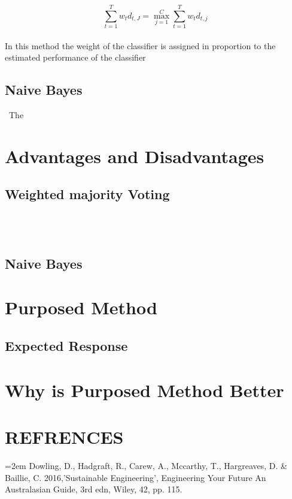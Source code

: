 \documentclass{article}
\begin{document}
$$\displaystyle\sum_{t=1}^{T}w_{t}d_{t,J}=\displaystyle\mathop{\max}_{j=1}^{C}\displaystyle\sum_{t=1}^{T}w_{t}d_{t,j}$$
\\
In this method the weight of the classifier is assigned in proportion to the estimated performance of the classifier
\subsection{Naive Bayes}\
The 


\section{Advantages and Disadvantages}
\subsection{Weighted majority Voting}\label{SEC:Enviro}
\\
\\

\subsection{Naive Bayes}\label{sec:Social}


\section{Purposed Method}
\subsection{Expected Response}\label{sec:EXPECTED}


        
\section{Why is Purposed Method Better}\label{conclusion}
\pagebreak
\section{REFRENCES}\label{refrences}
\begin{flushleft}

\hangindent=2em
Dowling, D., Hadgraft, R., Carew, A., Mccarthy, T., Hargreaves, D. \& Baillie, C. 2016,'Sustainable Engineering', Engineering Your Future An Australasian Guide, 3rd edn, Wiley, 42, pp. 115.\linebreak



\pagebreak
\end{flushleft}
\end{document}
